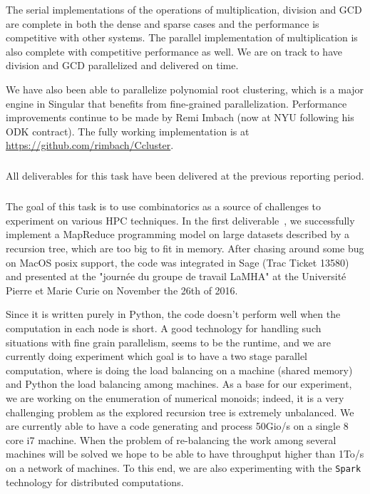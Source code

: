 The serial implementations of the operations of multiplication, division and GCD are complete in both the dense and sparse cases and the performance is competitive with other systems. The parallel implementation of multiplication is also complete with competitive performance as well. We are on track to have division and GCD parallelized and delivered on time.

We have also been able to parallelize polynomial root clustering, which is a
major engine in Singular that benefits from fine-grained
parallelization. Performance improvements continue to be made by Remi Imbach
(now at NYU following his ODK contract). The fully working implementation is
at \url{https://github.com/rimbach/Ccluster}.




  \subparagraph{}

  All deliverables for this task have been delivered at the previous
  reporting period.
  
  \subparagraph{}

  The goal of this task is to use combinatorics as a source of challenges to
  experiment on various HPC techniques. In the first
  deliverable~, we successfully implement a
  MapReduce programming model on large datasets described by a recursion
  tree, which are too big to fit in memory. After chasing around some bug on
  MacOS posix support, the code was integrated in Sage (Trac Ticket 13580) and
  presented at the "journée du groupe de travail LaMHA" at the Université Pierre et
  Marie Curie on November the 26th of 2016.

  Since it is written purely in Python, the code doesn't perform well when the
  computation in each node is short. A good technology for handling such
  situations with fine grain parallelism, seems to be the 
   runtime, and we are currently doing experiment which goal is to have a two
  stage parallel computation, where  is doing the load balancing on a
  machine (shared memory) and Python the load balancing among machines. As a
  base for our experiment, we are working on the enumeration of numerical
  monoids; indeed, it is a very challenging problem as the explored recursion
  tree is extremely unbalanced. We are currently able to have a code
  generating and process 50Gio/s on a single 8 core i7 machine. When the
  problem of re-balancing the work among several machines will be solved we
  hope to be able to have throughput higher than 1To/s on a network of machines.
  To this end, we are also experimenting with the \texttt{Spark}
  technology for distributed computations.

